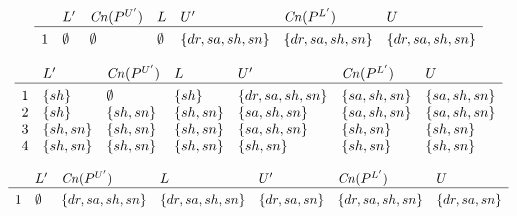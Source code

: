 \documentclass{article}
\begin{document}
\[
\begin{array}{c@{\hspace{10pt}}llllll}
& L' & \mathit{Cn}(P^{U'}) & L
& U' & \mathit{Cn}(P^{L'}) & U \\\hline\\[-3mm]
1 & \emptyset & \emptyset & \emptyset & \{dr,sa,sh,sn\} & \{dr,sa,sh,sn\} & \{dr,sa,sh,sn\} \\ 
\end{array}
\]

\[
\begin{array}{c@{\hspace{10pt}}llllll}
& L' & \mathit{Cn}(P^{U'}) & L
& U' & \mathit{Cn}(P^{L'}) & U \\\hline\\[-3mm]
1 & \{sh\} & \emptyset & \{sh\} & \{dr,sa,sh,sn\} & \{sa,sh,sn\} & \{sa,sh,sn\} \\ 
2 & \{sh\} & \{sh,sn\} & \{sh,sn\} & \{sa,sh,sn\} & \{sa,sh,sn\} & \{sa,sh,sn\} \\ 
3 & \{sh,sn\} & \{sh,sn\} & \{sh,sn\} & \{sa,sh,sn\} & \{sh,sn\} & \{sh,sn\} \\ 
4 & \{sh,sn\} & \{sh,sn\} & \{sh,sn\} & \{sh,sn\} & \{sh,sn\} & \{sh,sn\} \\ 
\end{array}
\]

\[
\begin{array}{c@{\hspace{10pt}}llllll}
& L' & \mathit{Cn}(P^{U'}) & L
& U' & \mathit{Cn}(P^{L'}) & U \\\hline\\[-3mm]
1 & \emptyset & \{dr,sa,sh,sn\} & \{dr,sa,sh,sn\} & \{dr,sa,sn\} & \{dr,sa,sh,sn\} & \{dr,sa,sn\} \\ 
\end{array}
\]
\end{document}
